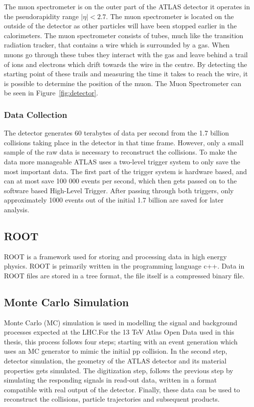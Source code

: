 \documentclass[12pt,a4paper]{article}
\numberwithin{equation}{section}
\begin{document}
The muon spectrometer is on the outer part of the ATLAS detector it operates in
the pseudorapidity range $|\eta| < 2.7$. The muon spectrometer is located on the
outside of the detector as other particles will have been stopped earlier in the
calorimeters. The muon spectrometer consists of tubes, much like the transition
radiation tracker, that contains a wire which is surrounded by a gas. When muons
go through these tubes they interact with the gas and leave behind a trail of
ions and electrons which drift towards the wire in the centre. By detecting the
starting point of these trails and measuring the time it takes to reach the
wire, it is possible to determine the position of the muon. The Muon
Spectrometer can be seen in Figure~\ref{fig:detector}.\cite{ATLAS-Muon}


\subsubsection{Data Collection}
The detector generates 60 terabytes of data per second from the 1.7 billion
collisions taking place in the detector in that time frame. However, only a
small sample of the raw data is necessary to reconstruct the collisions. To make
the data more manageable ATLAS uses a two-level trigger system to only save the
most important data. The first part of the trigger system is hardware based, and
can at most save 100 000 events per second, which then gets passed on to the
software based High-Level Trigger. After passing through both triggers, only
approximately 1000 events out of the initial 1.7 billion are saved for later
analysis.\cite{ATLAS-trig}



\subsection{ROOT}
ROOT is a framework used for storing and processing data in high energy physics.
ROOT is primarily written in the programming language c++. Data in ROOT files
are stored in a tree format, the file itself is a compressed binary
file.\cite{root}


\subsection{Monte Carlo Simulation}
Monte Carlo (MC) simulation is used in modelling the signal and background
processes expected at the LHC.\@ For the 13 TeV Atlas Open Data used in this
thesis, this process follows four steps; starting with an event generation which
uses an MC generator to mimic the initial pp collision. In the second step,
detector simulation, the geometry of the ATLAS detector and its material
properties gets simulated. The digitization step, follows the previous step by
simulating the responding signals in read-out data, written in a format
compatible with real output of the detector. Finally, these data can be used to
reconstruct the collisions, particle trajectories and subsequent
products.\\
\end{document}
